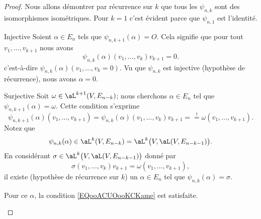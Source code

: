 \begin{proof}
    Nous allons démontrer par récurrence sur \( k\) que tous les \( \psi_{n,k}\) sont des isomorphismes isométriques. Pour \( k=1\) c'est évident parce que \( \psi_{n,1}\) est l'identité.

    \begin{subproof}
        \item[Injective]
            Soient \( \alpha\in E_n\) tels que \( \psi_{n,k+1}(\alpha)=O\). Cela signifie que pour tout \( v_1,\ldots, v_{k+1}\) nous avons
            \begin{equation}
                \psi_{n,k}(\alpha)(v_1,\ldots, v_k)v_{k+1}=0.
            \end{equation}
            c'est-à-dire \( \psi_{n,k}(\alpha)(v_1,\ldots, v_{k}=0)\). Vu que \( \psi_{n,k}\) est injective (hypothèse de récurrence), nous avons \( \alpha=0\).

        \item[Surjective]
            Soit \( \omega\in \aL^{k+1}(V,E_{n-k})\); nous cherchons \( \alpha\in E_n\) tel que \( \psi_{n,k+1}(\alpha)=\omega\). Cette condition s'exprime
            \begin{equation}        \label{EQooACUOooKCKame}
                \psi_{n,k+1}(\alpha)(v_1,\ldots, v_{k+1})=\psi_{n,k}(\alpha)(v_1,\ldots, v_k)v_{k+1}=\stackrel{!}{=}\omega(v_1,\ldots, v_{k+1}).
            \end{equation}
            Notez que
            \begin{equation}
                \psi_{n,k}(\alpha)\in \aL^k(V,E_{n-k})=\aL^k\big( V,\aL(V,E_{n-k-1}) \big).
            \end{equation}
            En considérant \( \sigma\in \aL^k\big( V,\aL(V,E_{n-k-1}) \big)\) donné par
            \begin{equation}
                \sigma(v_1,\ldots, v_k)v_{k+1}=\omega(v_1,\ldots, v_{k+1}),
            \end{equation}
            il existe (hypothèse de récurrence sur \( k\)) un \( \alpha\in E_n\) tel que \( \psi_{n,k}(\alpha)=\sigma\).

            Pour ce \( \alpha\), la condition \eqref{EQooACUOooKCKame} est satisfaite.


\end{subproof}
\end{proof}

